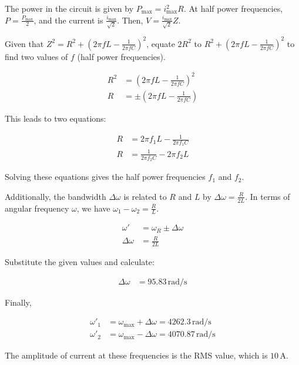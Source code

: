 \documentclass[journal,12pt,twocolumn]{IEEEtran}
\theoremstyle{remark}
\begin{document}
The power in the circuit is given by $P_{\text{max}} = i_{\text{max}}^2 R$. At half power frequencies, $P = \frac{P_{\text{max}}}{2}$, and the current is $\frac{i_{\text{max}}}{\sqrt{2}}$. Then, $V = \frac{i_{\text{max}}}{\sqrt{2}} Z$.

Given that $Z^2 = R^2 + \left(2\pi f L - \frac{1}{2\pi f C}\right)^2$, equate $2R^2$ to $R^2 + \left(2\pi f L - \frac{1}{2\pi f C}\right)^2$ to find two values of $f$ (half power frequencies).

\begin{align}
    R^2 &= \left(2\pi f L - \frac{1}{2\pi f C}\right)^2 \\
    R &= \pm \left(2\pi f L - \frac{1}{2\pi f C}\right)
\end{align}

This leads to two equations:

\begin{align}
    R &= 2\pi f_1 L - \frac{1}{2\pi f_1 C} \\
    R &= \frac{1}{2\pi f_2 C} - 2\pi f_2 L
\end{align}

Solving these equations gives the half power frequencies $f_1$ and $f_2$.

Additionally, the bandwidth $\Delta\omega$ is related to $R$ and $L$ by $\Delta\omega = \frac{R}{2L}$. In terms of angular frequency $\omega$, we have $\omega_1 - \omega_2 = \frac{R}{L}$.

\begin{align}
    \omega' &= \omega_R \pm \Delta\omega \\
    \Delta\omega &= \frac{R}{2L}
\end{align}

Substitute the given values and calculate:

\begin{align}
    \Delta\omega &= 95.83 \, \text{rad/s}
\end{align}

Finally,

\begin{align}
    \omega'_1 &= \omega_{\text{max}} + \Delta\omega = 4262.3 \, \text{rad/s} \\
    \omega'_2 &= \omega_{\text{max}} - \Delta\omega = 4070.87 \, \text{rad/s}
\end{align}

The amplitude of current at these frequencies is the RMS value, which is $10 \, \text{A}$.\\
\end{document}
